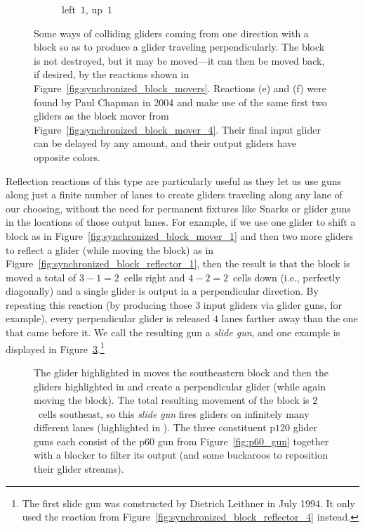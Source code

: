 \begin{figure}[!htb]
\begin{subfigure}{0.32\textwidth}
		\caption{left~$1$, up~$1$}
		\label{fig:synchronized_block_reflector_6}
	\end{subfigure}
	\caption{Some ways of colliding gliders coming from one direction with a block so as to produce a glider traveling perpendicularly. The block is not destroyed, but it may be moved---it can then be moved back, if desired, by the reactions shown in Figure~\ref{fig:synchronized_block_movers}. Reactions (e) and (f) were found by Paul Chapman in 2004 and make use of the same first two gliders as the block mover from Figure~\ref{fig:synchronized_block_mover_4}. Their final input glider can be delayed by any amount, and their output gliders have opposite colors.}\label{fig:synchronized_block_reflectors}
\end{figure}

Reflection reactions of this type are particularly useful as they let us use guns along just a finite number of lanes to create gliders traveling along any lane of our choosing, without the need for permanent fixtures like Snarks or glider guns in the locations of those output lanes. For example, if we use one glider to shift a block as in Figure~\ref{fig:synchronized_block_mover_1} and then two more gliders to reflect a glider (while moving the block) as in Figure~\ref{fig:synchronized_block_reflector_1}, then the result is that the block is moved a total of $3-1=2$~cells right and $4-2=2$~cells down (i.e., perfectly diagonally) and a single glider is output in a perpendicular direction. By repeating this reaction (by producing those $3$ input gliders via glider guns, for example), every perpendicular glider is released $4$ lanes farther away than the one that came before it. We call the resulting gun a \emph{slide gun}, and one example is displayed in Figure~\ref{fig:slide_gun}.\footnote{The first slide gun was constructed by Dietrich Leithner in July 1994. It only used the reaction from Figure~\ref{fig:synchronized_block_reflector_4} instead.}

\begin{figure}[!htb]
	\centering
	\caption{The glider highlighted in  moves the southeastern block and then the gliders highlighted in  and  create a perpendicular glider (while again moving the block). The total resulting movement of the block is $2$~cells southeast, so this \emph{slide gun} fires gliders on infinitely many different lanes (highlighted in ). The three constituent p$120$ glider guns each consist of the p$60$ gun from Figure~\ref{fig:p60_gun} together with a blocker to filter its output (and some buckaroos to reposition their glider streams).}\label{fig:slide_gun}
\end{figure}

